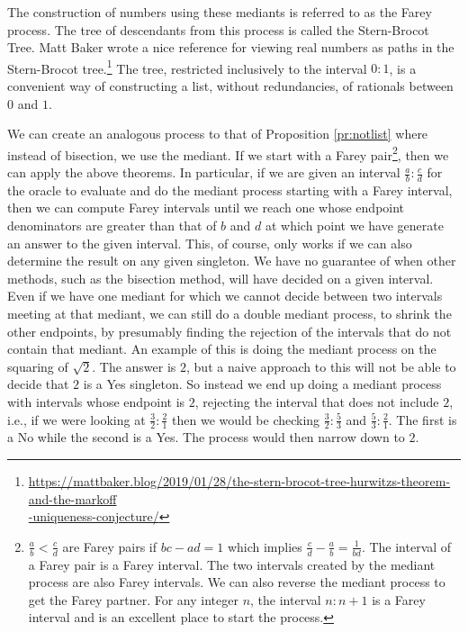\documentclass[12pt]{article}
\begin{document}
The construction of numbers using these mediants is referred to as the Farey process. The tree of descendants from this process is called the Stern-Brocot Tree. Matt Baker wrote a nice reference for viewing real numbers as paths in the Stern-Brocot tree.\footnote{{\href{https://mattbaker.blog/2019/01/28/the-stern-brocot-tree-hurwitzs-theorem-and-the-markoff-uniqueness-conjecture/}{https://mattbaker.blog/2019/01/28/the-stern-brocot-tree-hurwitzs-theorem-and-the-markoff} \\ \hspace*{10px}  \href{https://mattbaker.blog/2019/01/28/the-stern-brocot-tree-hurwitzs-theorem-and-the-markoff-uniqueness-conjecture/}{-uniqueness-conjecture/} }} The tree, restricted inclusively to the interval $0:1$, is a convenient way of constructing a list, without redundancies, of rationals between $0$ and $1$. 

We can create an analogous process to that of Proposition \ref{pr:notlist} where instead of bisection, we use the mediant. If we start with a Farey pair\footnote{$\frac{a}{b} < \frac{c}{d}$ are Farey pairs if $bc-ad=1$ which implies $\frac{c}{d} - \frac{a}{b} = \frac{1}{bd}$. The interval of a Farey pair is a Farey interval. The two intervals created by the mediant process are also Farey intervals. We can also reverse the mediant process to get the Farey partner. For any integer $n$, the interval $n:n+1$ is a Farey interval and is an excellent place to start the process.}, then we can apply the above theorems. In particular, if we are given an interval $\frac{a}{b} : \frac{c}{d}$ for the oracle to evaluate and do the mediant process starting with a Farey interval, then we can compute Farey intervals until we reach one whose endpoint denominators are greater than that of $b$ and $d$ at which point we have generate an answer to the given interval. This, of course, only works if we can also determine the result on any given singleton. We have no guarantee of when other methods, such as the bisection method, will have decided on a given interval. Even if we have one mediant for which we cannot decide between two intervals meeting at that mediant, we can still do a double mediant process, to shrink the other endpoints, by presumably finding the rejection of the intervals that do not contain that mediant. An example of this is doing the mediant process on the squaring of $\sqrt{2}$. The answer is $2$, but a naive approach to this will not be able to decide that $2$ is a Yes singleton. So instead we end up doing a mediant process with intervals whose endpoint is $2$, rejecting the interval that does not include $2$, i.e.,  if we were looking at $\frac{3}{2}:\frac{2}{1}$ then we would be checking $\frac{3}{2}:\frac{5}{3}$ and $\frac{5}{3}:\frac{2}{1}$. The first is a No while the second is a Yes. The process would then narrow down to $2$. 
\end{document}
